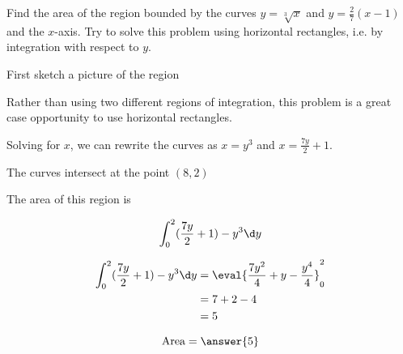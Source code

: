 \documentclass[handout]{ximera}
\begin{document}
\begin{exercise}
Find the area of the region bounded by the curves $y=\sqrt[3]{x}$ and $y=\frac{2}{7}(x-1)$ and the $x$-axis.  Try to solve this problem using horizontal rectangles, i.e. by integration with respect to $y$.

\begin{hint}

	First sketch a picture of the region

\begin{image}
\end{image}
\end{hint}

\begin{hint}
Rather than using two different regions of integration, this problem is a great case opportunity to use horizontal rectangles.

Solving for $x$, we can rewrite the curves as $x = y^3$ and $x = \frac{7y}{2}+1$.

The curves intersect at the point $(8,2)$
\end{hint}

\begin{hint}
	The area of this region is

	\[
	\int_{0}^{2} ( \frac{7y}{2}+1)-y^3 \d y
	\]
\end{hint}

\begin{hint}


	\begin{align*}
		\int_{0}^{2} ( \frac{7y}{2}+1)-y^3 \d y &=  \eval{\frac{7y^2}{4}+y-\frac{y^4}{4}}_0^2\\
		&= 7+2-4\\
		&= 5
	\end{align*}

	
\end{hint}

\begin{prompt}
	\[
		\textrm{Area} = \answer{5}
	\]
\end{prompt}

\end{exercise}
\end{document}

